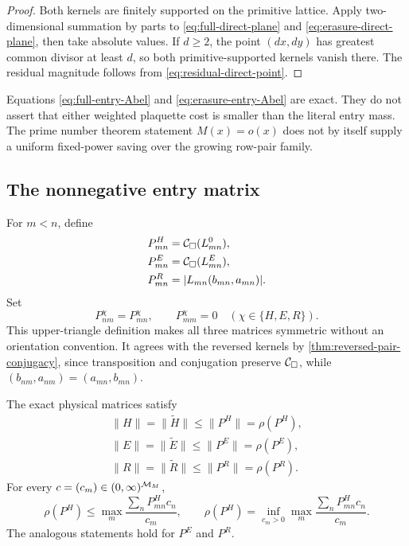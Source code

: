 \begin{proof}
Both kernels are finitely supported on the primitive lattice.  Apply
two-dimensional summation by parts to
\eqref{eq:full-direct-plane} and
\eqref{eq:erasure-direct-plane}, then take absolute values.  If \(d\ge2\),
the point \((dx,dy)\) has greatest common divisor at least \(d\), so both
primitive-supported kernels vanish there.  The residual magnitude follows
from \eqref{eq:residual-direct-point}.
\end{proof}

\begin{remark}
Equations \eqref{eq:full-entry-Abel} and
\eqref{eq:erasure-entry-Abel} are exact.  They do not assert that either
weighted plaquette cost is smaller than the literal entry mass.  The
prime number theorem statement \(M(x)=o(x)\) does not by itself supply a
uniform fixed-power saving over the growing row-pair family.
\end{remark}

\subsection{The nonnegative entry matrix}

For \(m<n\), define
\begin{align}
 P^H_{mn}
 &=\mathcal C_\square(L_{mn}^{0}),
 \label{eq:full-Perron-majorant}\\
 P^E_{mn}
 &=\mathcal C_\square(L_{mn}^{E}),
 \label{eq:erasure-Perron-majorant}\\
 P^R_{mn}
 &=|L_{mn}(b_{mn},a_{mn})|.
 \label{eq:residual-Perron-majorant}
\end{align}
Set
\[
 P^\chi_{nm}=P^\chi_{mn},\qquad
 P^\chi_{mm}=0
 \quad(\chi\in\{H,E,R\}).
\]
This upper-triangle definition makes all three matrices symmetric without
an orientation convention.  It agrees with the reversed kernels by
\cref{thm:reversed-pair-conjugacy}, since transposition and conjugation
preserve \(\mathcal C_\square\), while
\((b_{nm},a_{nm})=(a_{mn},b_{mn})\).

\begin{theorem}
\label{thm:literal-Perron-certificates}
The exact physical matrices satisfy
\begin{align}
 \boxed{\|H\|=\|\widetilde H\|\le\|P^H\|=\rho(P^H),}
 \label{eq:full-Perron-certificate}\\
 \boxed{\|E\|=\|\widetilde E\|\le\|P^E\|=\rho(P^E),}
 \label{eq:erasure-Perron-certificate}\\
 \boxed{\|R\|=\|\widetilde R\|\le\|P^R\|=\rho(P^R).}
 \label{eq:residual-Perron-certificate}
\end{align}
For every \(c=(c_m)\in(0,\infty)^{\mathcal M_M}\),
\begin{equation}
 \rho(P^H)
 \le
 \max_m\frac{\sum_nP^H_{mn}c_n}{c_m},
 \qquad
 \rho(P^H)
 =
 \inf_{c_m>0}
 \max_m\frac{\sum_nP^H_{mn}c_n}{c_m}.
 \label{eq:weighted-Collatz}
\end{equation}
The analogous statements hold for \(P^E\) and \(P^R\).
\end{theorem}

